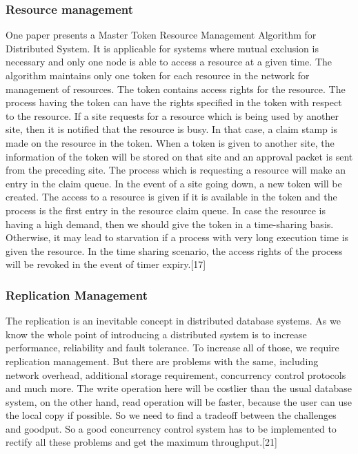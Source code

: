 \documentclass{article}[12pt,a4paper]
\begin{document}
\subsubsection {Resource management}

	One paper presents a Master Token Resource Management Algorithm for Distributed System. It is applicable for systems where mutual exclusion is necessary and only one node is able to access a resource at a given time. The algorithm maintains only one token for each resource in the network for management of resources. The token contains access rights for the resource. The process having the token can have the rights specified in the token with respect to the resource. If a site requests for a resource which is being used by another site, then it is notified that the resource is busy. In that case, a claim stamp is made on the resource in the token. When a token is given to another site, the information of the token will be stored on that site and an approval packet is sent from the preceding site. The process which is requesting a resource will make an entry in the claim queue. In the event of a site going down, a new token will be created. The access to a  resource is given if it is available in the token and the process is the first entry in the resource claim queue. In case the resource is having a high demand, then we should give the token in a time-sharing basis. Otherwise, it may lead to starvation if a process with very long execution time is given the resource. In the time sharing scenario, the access rights of the process will be revoked in the event of timer expiry.[17]




\subsubsection {Replication Management}
	The replication is an inevitable concept in distributed database systems. As we know the whole point of introducing a distributed system is to increase performance, reliability and fault tolerance. To increase all of those, we require replication management. But there are problems with the same, including network overhead, additional storage requirement, concurrency control protocols and much more. The write operation here will be costlier than the usual database system, on the other hand, read operation will be faster, because the user can use the local copy if possible. So we need to find a tradeoff between the challenges and goodput. So a good concurrency control system has to be implemented to rectify all these problems and get the maximum throughput.[21]
\end{document}
